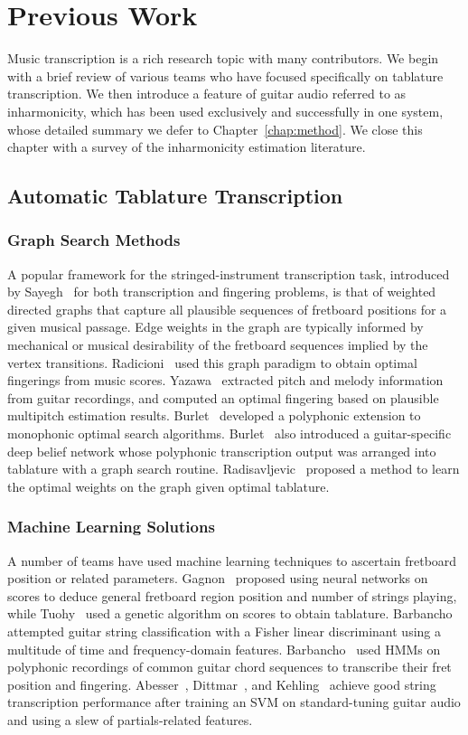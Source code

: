 \documentclass[12pt]{cmuthesis}
\begin{document}
\noindent
\chapter{Previous Work}
\label{chap:lit-review}
Music transcription is a rich research topic with many contributors. We begin with a brief review of various teams who have focused specifically on tablature transcription. We then introduce a feature of guitar audio referred to as inharmonicity, which has been used exclusively and successfully in one system, whose detailed summary we defer to Chapter~\ref{chap:method}. We close this chapter with a survey of the inharmonicity estimation literature.

\section{Automatic Tablature Transcription}
\subsection{Graph Search Methods}
A popular framework for the stringed-instrument transcription task, introduced by Sayegh~\cite{sayegh1989} for both transcription and fingering problems, is that of weighted directed graphs that capture all plausible sequences of fretboard positions for a given musical passage. Edge weights in the graph are typically informed by mechanical or musical desirability of the fretboard sequences implied by the vertex transitions. Radicioni~\cite{radicioni2005} used this graph paradigm to obtain optimal fingerings from music scores. Yazawa~\cite{yazawa2013} extracted pitch and melody information from guitar recordings, and computed an optimal fingering based on plausible multipitch estimation results. Burlet~\cite{burlet2013} developed a polyphonic extension to monophonic optimal search algorithms. Burlet~\cite{burlet2015} also introduced a guitar-specific deep belief network whose polyphonic transcription output was arranged into tablature with a graph search routine. Radisavljevic~\cite{radisav2004} proposed a method to learn the optimal weights on the graph given optimal tablature.

\subsection{Machine Learning Solutions}
A number of teams have used machine learning techniques to ascertain fretboard position or related parameters. Gagnon~\cite{gagnon2003} proposed using neural networks on scores to deduce general fretboard region position and number of strings playing, while Tuohy~\cite{tuohy2006} used a genetic algorithm on scores to obtain tablature. Barbancho~\cite{barbancho2009} attempted guitar string classification with a Fisher linear discriminant using a multitude of time and frequency-domain features. Barbancho~\cite{barbanchoa2012} used HMMs on polyphonic recordings of common guitar chord sequences to transcribe their fret position and fingering. Abesser~\cite{abesser2012}, Dittmar~\cite{dittmar2013}, and Kehling~\cite{kehling2014} achieve good string transcription performance after training an SVM on standard-tuning guitar audio and using a slew of partials-related features.
\end{document}

